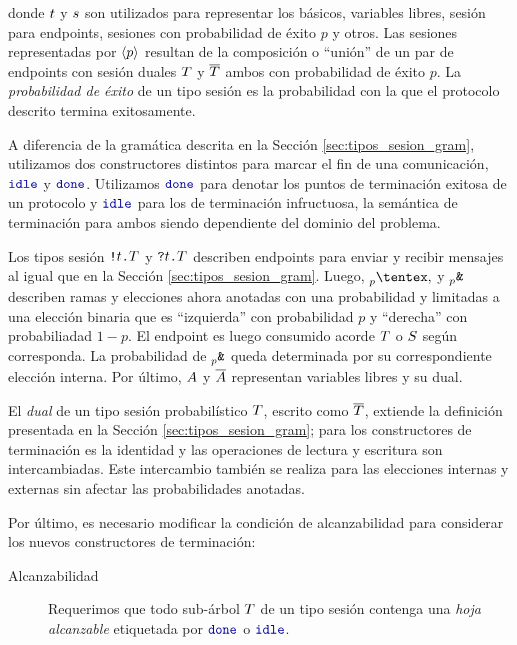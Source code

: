 donde $t$ y $s$ son utilizados para representar los  básicos,
variables libres, sesión para endpoints, sesiones con probabilidad de
éxito $p$ y otros. Las sesiones representadas por $\langle p \rangle$ resultan
de la composición o ``unión'' de un par de endpoints con sesión duales
$T$ y $\overline{T}$ ambos con probabilidad de éxito $p$. La
\emph{probabilidad de éxito} de un tipo sesión es la probabilidad con la que
el protocolo descrito termina exitosamente.

A diferencia de la gramática descrita en la Sección \ref{sec:tipos_sesion_gram},
utilizamos dos constructores distintos para marcar el fin de una comunicación,
$\Idle$ y $\Done$. Utilizamos $\Done$ para denotar los puntos de terminación
exitosa de un protocolo y $\Idle$ para los de terminación infructuosa, la
semántica de terminación para ambos siendo dependiente del dominio del problema.

Los tipos sesión ${\texttt{\upshape!}}{t}\texttt{\upshape.}T$ y ${\texttt{\upshape?}}{t}\texttt{\upshape.}T$ describen
endpoints para enviar y recibir mensajes al igual que en la Sección
\ref{sec:tipos_sesion_gram}. Luego, $\PChoice$ y $\PBranch$ describen ramas y
elecciones  ahora anotadas con una probabilidad y limitadas a una elección
binaria que es ``izquierda'' con probabilidad $p$ y ``derecha'' con
probabiliadad $1 - p$. El endpoint es luego consumido acorde $T$ o
$S$ según corresponda. La probabilidad de $\PBranch$ queda
determinada por su correspondiente elección interna. Por último, $A$ y
$\overline{A}$ representan variables libres y su dual.

El \emph{dual} de un tipo sesión probabilístico $T$, escrito como
$\overline{T}$, extiende la definición presentada en la Sección
\ref{sec:tipos_sesion_gram}; para los constructores de terminación es la
identidad y las operaciones de lectura y escritura son intercambiadas. Este
intercambio también se realiza para las elecciones internas y externas sin
afectar las probabilidades anotadas.

Por último, es necesario modificar la condición de alcanzabilidad para
considerar los nuevos constructores de terminación:
\begin{description}
	\item[Alcanzabilidad] Requerimos que todo sub-árbol $T$ de un
		tipo sesión contenga una \emph{hoja alcanzable} etiquetada por $\Done$ o
		$\Idle$.
\end{description}
